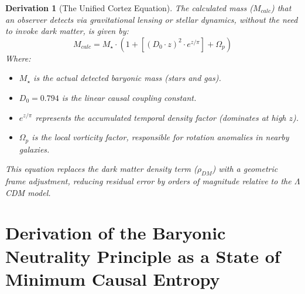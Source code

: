 \documentclass[10pt, a4paper]{article}
\newtheorem{derivation}{Derivation}
\begin{document}
\begin{derivation}[The Unified Cortez Equation]
The calculated mass ($M_{calc}$) that an observer detects via gravitational lensing or stellar dynamics, without the need to invoke dark matter, is given by:
\begin{equation}
    M_{calc} = M_{\star} \cdot \left( 1 + [(D_0 \cdot z)^2 \cdot e^{z/\pi}] + \Omega_p \right)
\end{equation}
Where:
\begin{itemize}
    \item $M_{\star}$ is the actual detected baryonic mass (stars and gas).
    \item $D_0 = 0.794$ is the linear causal coupling constant.
    \item $e^{z/\pi}$ represents the accumulated temporal density factor (dominates at high $z$).
    \item $\Omega_p$ is the local vorticity factor, responsible for rotation anomalies in nearby galaxies.
\end{itemize}
This equation replaces the dark matter density term ($\rho_{DM}$) with a geometric frame adjustment, reducing residual error by orders of magnitude relative to the $\Lambda$CDM model.
\end{derivation}

\section{Derivation of the Baryonic Neutrality Principle as a State of Minimum Causal Entropy}
\end{document}
